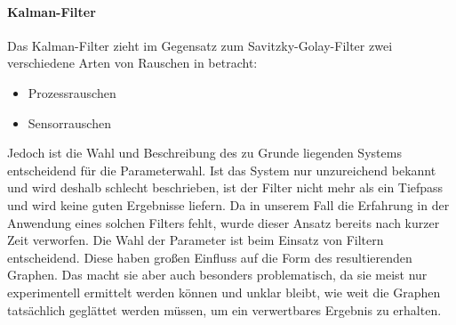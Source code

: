 \paragraph{Kalman-Filter}
Das Kalman-Filter zieht im Gegensatz zum Savitzky-Golay-Filter zwei verschiedene Arten von Rauschen in betracht:
\begin{itemize}
\item Prozessrauschen 
\item Sensorrauschen
\end{itemize}
Jedoch ist die Wahl und Beschreibung des zu Grunde liegenden Systems entscheidend für die Parameterwahl. Ist das System nur unzureichend bekannt und wird deshalb schlecht beschrieben, ist der Filter nicht mehr als ein Tiefpass und wird keine guten Ergebnisse liefern. Da in unserem Fall die Erfahrung in der Anwendung eines solchen Filters fehlt, wurde dieser Ansatz bereits nach kurzer Zeit verworfen.
Die Wahl der Parameter ist beim Einsatz von Filtern entscheidend. Diese haben großen Einfluss auf die Form des resultierenden Graphen. Das macht sie aber auch besonders problematisch, da sie meist nur experimentell ermittelt werden können und unklar bleibt, wie weit die Graphen tatsächlich geglättet werden müssen, um ein verwertbares Ergebnis zu erhalten. 